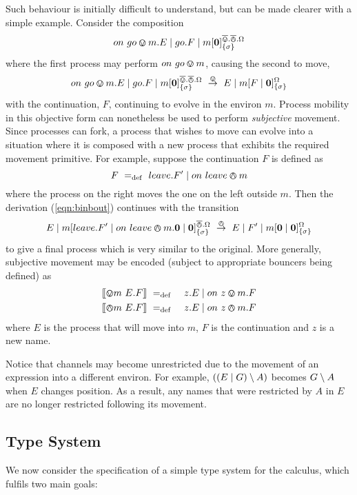 \documentclass[orivec,envcountsame]{llncs}
\begin{document}
Such behaviour is initially difficult to understand, but can be made
clearer with a simple example.  Consider the composition
%
\[
  on\ go \varovee m.E \mid go.F \mid {m}[ \textbf{0} ]^{\overline{\varovee}.\overline{\varowedge}.\Omega}_{\{\sigma\}}
\]
%
where the first process may perform $on\ go \varovee m$, causing
the second to move,
%
\begin{equation}
on\ go \varovee m.E \mid go.F \mid {m}[ \textbf{0} ]^{\overline{\varovee}.\overline{\varowedge}.\Omega}_{\{\sigma\}} ~\stackrel{\varovee}{\rightarrow}~
E \mid {m}[ F \mid \textbf{0} ]^{\Omega}_{\{\sigma\}}
\label{eqn:binbout}
\end{equation}
%
with the continuation, $F$, continuing to evolve in the
environ $m$.  Process mobility in this objective form can nonetheless be used
to perform \emph{subjective} movement.  Since processes can fork, a process that
wishes to move can evolve into a situation where it is composed with a new process that exhibits the required movement
primitive. For example, suppose the continuation $F$ is defined as
%
\[
F \mathrel{~=_\mathrm{def}~} leave.F^\prime \mid on\ leave \varowedge m
\]
%
where the process on the right moves the one on the left
outside $m$. Then the derivation (\ref{eqn:binbout}) continues with the transition
%
\[
E \mid {m}[ leave.F^\prime \mid on\ leave \varowedge m.\textbf{0} \mid
 \textbf{0} ]^{\overline{\varowedge}.\Omega}_{\{\sigma\}} 
~\stackrel{\varowedge}{\rightarrow}~
E \mid F^\prime \mid {m}[ \textbf{0} \mid \textbf{0} ]^{\Omega}_{\{\sigma\}}
\]
%
to give a final process which is very similar to the original.
More generally, subjective movement may be encoded (subject to
appropriate bouncers being defined) as
%
\begin{eqnarray*}
\seml \sprocin{m}{E}.F \semr & \eqdef & z.E \pc \procin{z}{m}.F \\
\seml \sprocout{m}{E}.F \semr & \eqdef & z.E \pc \procout{z}{m}.F
\end{eqnarray*}
%
where $E$ is the process that will move into $m$, $F$ is the
continuation and $z$ is a new name. 

Notice that channels may become unrestricted due to the movement of an
expression into a different environ.  For example, $((E \mid G) \setminus {A})$
becomes $G \setminus {A}$ when $E$ changes position.  As a result, any names
that were restricted by $A$ in $E$ are no longer
restricted following its movement.

\subsection{Type System}
\label{typesys}

We now consider the specification of a simple type system for the
calculus, which fulfils two main goals:
\end{document}
